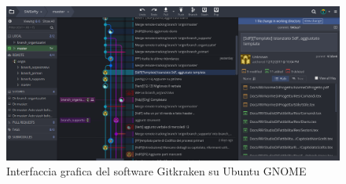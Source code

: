 		\begin{figure}[H]
			\centering
			\includegraphics[width=1\textwidth]{Images/gitkraken.png}
			\caption{Interfaccia grafica del software Gitkraken su Ubuntu GNOME}
		\end{figure}
